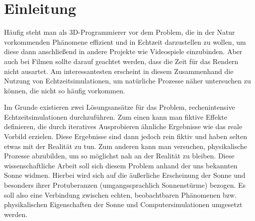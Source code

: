 \section{Einleitung}
Häufig steht man als 3D-Programmierer vor dem Problem, die in der Natur
vorkommenden Phänomene effizient und in Echtzeit darzustellen zu wollen, um
diese dann anschließend in andere Projekte wie Videospiele einzubinden. Aber
auch bei Filmen sollte darauf geachtet werden, dass die Zeit für das Rendern
nicht ausartet. Am interessantesten erscheint in diesem Zusammenhand die Nutzung
von Echtzeitsimulationen, um natürliche Prozesse näher untersuchen zu können,
die nicht so häufig vorkommen.

Im Grunde existieren zwei Lösungsansätze für das Problem, rechenintensive
Echtzeitsimulationen durchzuführen. Zum einen kann man fiktive Effekte
definieren, die durch iteratives Ausprobieren ähnliche Ergebnisse wie das reale
Vorbild erzielen. Diese Ergebnisse sind dann jedoch rein fiktiv und haben selten
etwas mit der Realität zu tun. Zum anderen kann man versuchen, physikalische
Prozesse abzubilden, um so möglichst nah an der Realität zu bleiben. Diese
wissenschaftliche Arbeit soll sich diesem Problem anhand der uns bekannten Sonne
widmen. Hierbei wird sich auf die äußerliche Erscheinung der Sonne und besonders
ihrer Protuberanzen (umgangssprachlich Sonnenstürme) bezogen. Es soll also eine
Verbindung zwischen echten, beobachtbaren Phänomenen bzw.  physikalischen
Eigenschaften der Sonne und Computersimulationen umgesetzt werden.
